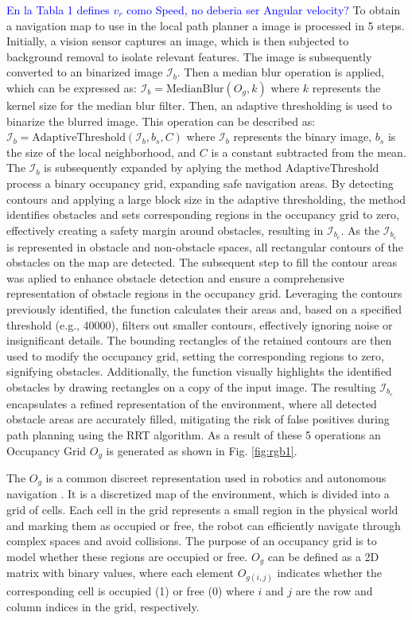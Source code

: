 \documentclass[conference]{IEEEtran}
\newcommand{\revL}[1]{\textcolor{blue}{#1}}
\begin{document}
\revL{En la Tabla 1 defines $v_r$ como Speed, no deberia ser Angular velocity?}
To obtain a navigation map to use in the local path planner a image is processed in 5 steps. Initially, a vision sensor captures an image, which is then subjected to background removal to isolate relevant features. The image is subsequently converted to an binarized image $\mathcal{I}_{b}$. Then a median blur operation is applied, which can be expressed as: $\mathcal{I}_{b} = \text{MedianBlur}(O_{g}, k)$ where $k$ represents the kernel size for the median blur filter. Then, an adaptive thresholding is used to binarize the blurred image. This operation can be described as: $\mathcal{I}_{b} =\text{AdaptiveThreshold}(\mathcal{I}_{b}, b_{s}, C)$ where $\mathcal{I}_{b}$ represents the binary image, $b_{s}$ is the size of the local neighborhood, and $C$ is a constant subtracted from the mean.  The $\mathcal{I}_{b}$ is subsequently expanded by aplying the method $\text{AdaptiveThreshold}$ process a binary occupancy grid, expanding safe navigation areas. By detecting contours and applying a large block size in the adaptive thresholding, the method identifies obstacles and sets corresponding regions in the occupancy grid to zero, effectively creating a safety margin around obstacles, resulting in $\mathcal{I}_{b_{e}}$. As the $\mathcal{I}_{b_{e}}$ is represented in obstacle and non-obstacle spaces, all rectangular contours of the obstacles on the map are detected. The subsequent step to fill the contour areas was aplied to enhance obstacle detection and ensure a comprehensive representation of obstacle regions in the occupancy grid. Leveraging the contours previously identified, the function calculates their areas and, based on a specified threshold (e.g., 40000), filters out smaller contours, effectively ignoring noise or insignificant details. The bounding rectangles of the retained contours are then used to modify the occupancy grid, setting the corresponding regions to zero, signifying obstacles. Additionally, the function visually highlights the identified obstacles by drawing rectangles on a copy of the input image. The resulting $\mathcal{I}_{b_{e}}$ encapsulates a refined representation of the environment, where all detected obstacle areas are accurately filled, mitigating the risk of false positives during path planning using the RRT algorithm. As a result of these 5 operations an Occupancy Grid $O_{g}$ is generated as shown in Fig. \ref{fig:rgb1}. 

The $O_{g}$ is a common discreet representation used in robotics and autonomous navigation \cite{ijgi11040231}. It is a discretized map of the environment, which is divided into a grid of cells. Each cell in the grid represents a small region in the physical world and marking them as occupied or free, the robot can efficiently navigate through complex spaces and avoid collisions. The purpose of an occupancy grid is to model whether these regions are occupied or free.  $O_{g}$ can be defined as a 2D matrix with binary values, where each element $O_{g(i, j)}$ indicates whether the corresponding cell is occupied (1) or free (0) where $i$ and $j$ are the row and column indices in the grid, respectively. 
\end{document}
